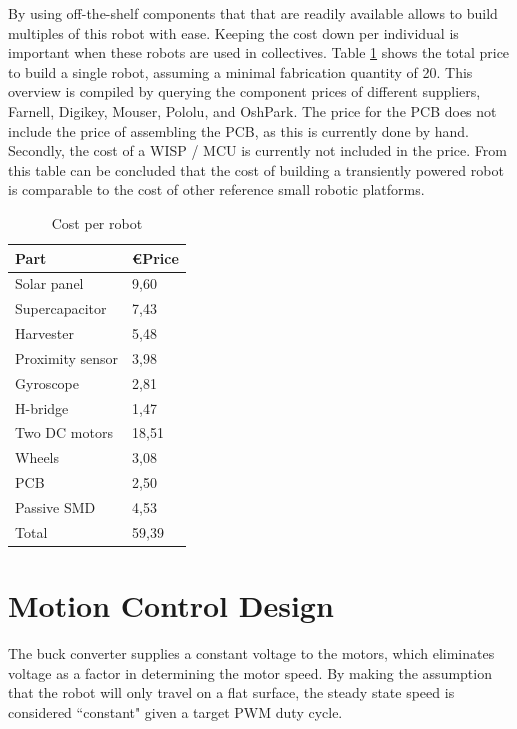 By using off-the-shelf components that that are readily available allows to build multiples of this robot with ease.
Keeping the cost down per individual is important when these robots are used in collectives.
Table \ref{tab:cost_robot} shows the total price to build a single robot, assuming a minimal fabrication quantity of 20.
This overview is compiled by querying the component prices of different suppliers, Farnell, Digikey, Mouser, Pololu, and OshPark.
The price for the PCB does not include the price of assembling the PCB, as this is currently done by hand.
Secondly, the cost of a WISP / MCU is currently not included in the price.
From this table can be concluded that the cost of building a transiently powered robot is comparable to the cost of other reference small robotic platforms.


\begin{table}[t]
	\centering
	\caption{Cost per robot}
	\label{tab:cost_robot}
	\begin{tabular}{|l|l|} 
		\hline
		Part & \euro Price \\
		\hline\hline
		Solar panel & 9,60\\
		Supercapacitor & 7,43\\
		Harvester & 5,48 \\
		Proximity sensor & 3,98 \\
		Gyroscope & 2,81\\	
		H-bridge & 1,47 \\
		Two DC motors & 18,51 \\
		Wheels & 3,08\\
		PCB & 2,50 \\
		Passive SMD & 4,53\\
		\hline \hline
		Total & 59,39 \\
		\hline
	\end{tabular}
\end{table}


\section{Motion Control Design}
\label{sec:dai_control_design}
The buck converter supplies a constant voltage to the motors, which eliminates voltage as a factor in determining the motor speed.
By making the assumption that the robot will only travel on a flat surface, the steady state speed is considered ``constant" given a target PWM duty cycle.

